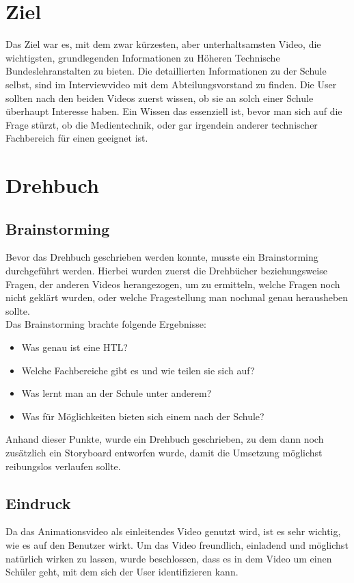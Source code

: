 \section{Ziel}
\renewcommand{\kapitelautor}{Autor: Niklas Kienreich}
Das Ziel war es, mit dem zwar kürzesten, aber unterhaltsamsten Video, die wichtigsten, grundlegenden Informationen zu Höheren Technische Bundeslehranstalten zu bieten. Die detaillierten Informationen zu der Schule selbst, sind im Interviewvideo mit dem Abteilungsvorstand zu finden. Die User sollten nach den beiden Videos zuerst wissen, ob sie an solch einer Schule überhaupt Interesse haben. Ein Wissen das essenziell ist, bevor man sich auf die Frage stürzt, ob die Medientechnik, oder gar irgendein anderer technischer Fachbereich für einen geeignet ist.
\section{Drehbuch}
\renewcommand{\kapitelautor}{Autor: Niklas Kienreich}
\subsection{Brainstorming}
Bevor das Drehbuch geschrieben werden konnte, musste ein Brainstorming durchgeführt werden. Hierbei wurden zuerst die Drehbücher beziehungsweise Fragen, der anderen Videos herangezogen, um zu ermitteln, welche Fragen noch nicht geklärt wurden, oder welche Fragestellung man nochmal genau herausheben sollte.
\leavevmode \\
Das Brainstorming brachte folgende Ergebnisse:
\begin{itemize}
\item Was genau ist eine HTL?
\item Welche Fachbereiche gibt es und wie teilen sie sich auf?
\item Was lernt man an der Schule unter anderem?
\item Was für Möglichkeiten bieten sich einem nach der Schule?
\end{itemize}
Anhand dieser Punkte, wurde ein Drehbuch geschrieben, zu dem dann noch zusätzlich ein Storyboard entworfen wurde, damit die Umsetzung möglichst reibungslos verlaufen sollte.
\subsection{Eindruck}
Da das Animationsvideo als einleitendes Video genutzt wird, ist es sehr wichtig, wie es auf den Benutzer wirkt. Um das Video freundlich, einladend und möglichst natürlich wirken zu lassen, wurde beschlossen, dass es in dem Video um einen Schüler geht, mit dem sich der User identifizieren kann.
